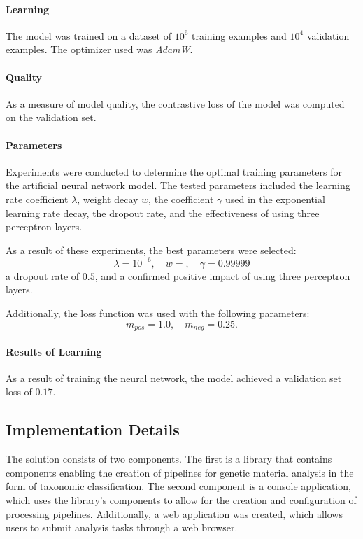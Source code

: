 \documentclass[pdflatex,sn-vancouver-num]{sn-jnl}%
\begin{document}
                \paragraph{Learning}
                The model was trained on a dataset of $10^{6}$ training examples and $10^{4}$ validation examples. The optimizer used was \textit{AdamW}\cite{Loshchilov2017DecoupledWD}.

                \paragraph{Quality}
                As a measure of model quality, the contrastive loss of the model was computed on the validation set.

                \paragraph{Parameters}
                Experiments were conducted to determine the optimal training parameters for the artificial neural network model. The tested parameters included the learning rate coefficient \( \lambda \), weight decay \( w \), the coefficient \( \gamma \) used in the exponential learning rate decay, the dropout rate, and the effectiveness of using three perceptron layers.

                As a result of these experiments, the best parameters were selected:
                \[
                \lambda = 10^{-6}, \quad w = , \quad \gamma = 0.99999
                \]
                a dropout rate of \( 0.5 \), and a confirmed positive impact of using three perceptron layers.

                Additionally, the loss function was used with the following parameters:
                \[
                m_{pos} = 1.0, \quad m_{neg} = 0.25.
                \]


                \paragraph{Results of Learning}
                As a result of training the neural network, the model achieved a validation set loss of $0.17$.


        \subsection{Implementation Details}
            The solution consists of two components. The first is a library that contains components enabling the creation of pipelines for genetic material analysis in the form of taxonomic classification. The second component is a console application, which uses the library's components to allow for the creation and configuration of processing pipelines. Additionally, a web application was created, which allows users to submit analysis tasks through a web browser.  
\end{document}

